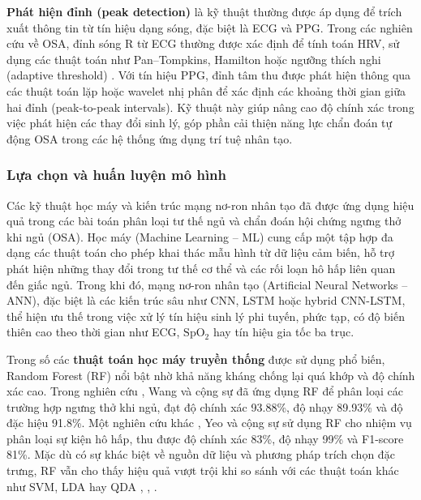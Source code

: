 \textbf{Phát hiện đỉnh (peak detection)} là kỹ thuật thường được áp dụng
để trích xuất thông tin từ tín hiệu dạng sóng, đặc biệt là ECG và PPG.
Trong các nghiên cứu về OSA, đỉnh sóng R từ ECG thường được xác định
để tính toán HRV, sử dụng các thuật toán như Pan–Tompkins, Hamilton
hoặc ngưỡng thích nghi (adaptive threshold) \cite{osa_sanchez2025}. Với tín hiệu PPG,
đỉnh tâm thu được phát hiện thông qua các thuật toán lặp hoặc
wavelet nhị phân để xác định các khoảng thời gian giữa hai đỉnh
(peak-to-peak intervals). Kỹ thuật này giúp nâng cao độ chính xác
trong việc phát hiện các thay đổi sinh lý, góp phần cải thiện năng
lực chẩn đoán tự động OSA trong các hệ thống ứng dụng trí tuệ nhân tạo.

\subsubsection{Lựa chọn và huấn luyện mô hình}
Các kỹ thuật học máy và kiến trúc mạng nơ-ron nhân tạo đã được ứng dụng hiệu
quả trong các bài toán phân loại tư thế ngủ và chẩn đoán hội chứng ngưng thở
khi ngủ (OSA). Học máy (Machine Learning – ML) cung cấp một tập hợp đa dạng các
thuật toán cho phép khai thác mẫu hình từ dữ liệu cảm biến, hỗ trợ phát hiện
những thay đổi trong tư thế cơ thể và các rối loạn hô hấp liên quan đến giấc
ngủ. Trong khi đó, mạng nơ-ron nhân tạo (Artificial Neural Networks – ANN), đặc
biệt là các kiến trúc sâu như CNN, LSTM hoặc hybrid CNN-LSTM, thể hiện ưu thế
trong việc xử lý tín hiệu sinh lý phi tuyến, phức tạp, có độ biến thiên cao
theo thời gian như ECG, $\mathrm{SpO_2}$ hay tín hiệu gia tốc ba trục.

Trong số các \textbf{thuật toán học máy truyền thống} được sử dụng phổ biến,
Random Forest (RF) \cite{genuer2020random} nổi bật nhờ khả năng kháng chống lại
quá khớp và độ chính xác cao. Trong nghiên cứu \cite{wang2023ml_wearable}, Wang
và cộng sự đã ứng dụng RF để phân loại các trường hợp ngưng thở khi ngủ, đạt độ
chính xác 93.88\%, độ nhạy 89.93\% và độ đặc hiệu 91.8\%. Một nghiên cứu khác
\cite{yeo2022respiratory}, Yeo và cộng sự sử dụng RF cho nhiệm vụ phân loại sự
kiện hô hấp, thu được độ chính xác 83\%, độ nhạy 99\% và F1-score 81\%. Mặc dù
có sự khác biệt về nguồn dữ liệu và phương pháp trích chọn đặc trưng, RF vẫn
cho thấy hiệu quả vượt trội khi so sánh với các thuật toán khác như SVM, LDA
hay QDA \cite{wang2023ml_wearable}, \cite{yeo2022respiratory},
\cite{parbat2024multiscale}.

